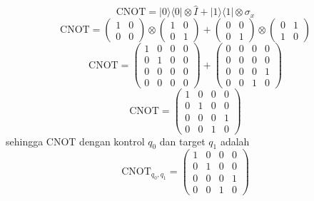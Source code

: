 \begin{equation}
    \text{CNOT} = |0\rangle\langle 0| \otimes \hat{I} + |1\rangle\langle 1| \otimes \sigma_x
\end{equation}
\begin{equation}
    \text{CNOT} = \begin{pmatrix} 1 & 0 \\ 0 & 0 \end{pmatrix} \otimes \begin{pmatrix} 1 & 0 \\ 0 & 1 \end{pmatrix} + \begin{pmatrix} 0 & 0 \\ 0 & 1 \end{pmatrix} \otimes \begin{pmatrix} 0 & 1 \\ 1 & 0 \end{pmatrix}
\end{equation}
\begin{equation}
    \text{CNOT} = \begin{pmatrix} 1 & 0 & 0 & 0 \\ 0 & 1 & 0 & 0 \\ 0 & 0 & 0 & 0 \\ 0 & 0 & 0 & 0 \end{pmatrix} + \begin{pmatrix} 0 & 0 & 0 & 0 \\ 0 & 0 & 0 & 0 \\ 0 & 0 & 0 & 1 \\ 0 & 0 & 1 & 0 \end{pmatrix}
\end{equation}
\begin{equation}
    \text{CNOT} = \begin{pmatrix} 1 & 0 & 0 & 0 \\ 0 & 1 & 0 & 0 \\ 0 & 0 & 0 & 1 \\ 0 & 0 & 1 & 0 \end{pmatrix}
\end{equation}
sehingga CNOT dengan kontrol $q_0$ dan target $q_1$ adalah 
\begin{equation}
    \text{CNOT}_{q_0, q_1} = \begin{pmatrix} 1 & 0 & 0 & 0 \\ 0 & 1 & 0 & 0 \\ 0 & 0 & 0 & 1 \\ 0 & 0 & 1 & 0 \end{pmatrix}
\end{equation}
